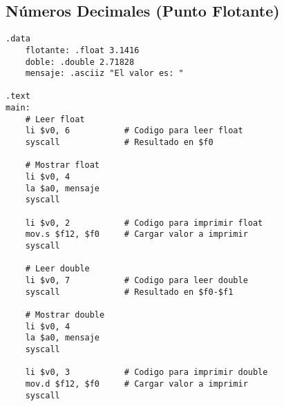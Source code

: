 \documentclass{article}
\begin{document}
\subsection{Números Decimales (Punto Flotante)}
\begin{lstlisting}[language={[mips]Assembler}]
.data
    flotante: .float 3.1416
    doble: .double 2.71828
    mensaje: .asciiz "El valor es: "

.text
main:
    # Leer float
    li $v0, 6           # Codigo para leer float
    syscall             # Resultado en $f0

    # Mostrar float
    li $v0, 4
    la $a0, mensaje
    syscall

    li $v0, 2           # Codigo para imprimir float
    mov.s $f12, $f0     # Cargar valor a imprimir
    syscall

    # Leer double
    li $v0, 7           # Codigo para leer double
    syscall             # Resultado en $f0-$f1

    # Mostrar double
    li $v0, 4
    la $a0, mensaje
    syscall

    li $v0, 3           # Codigo para imprimir double
    mov.d $f12, $f0     # Cargar valor a imprimir
    syscall
\end{lstlisting}
\end{document}
